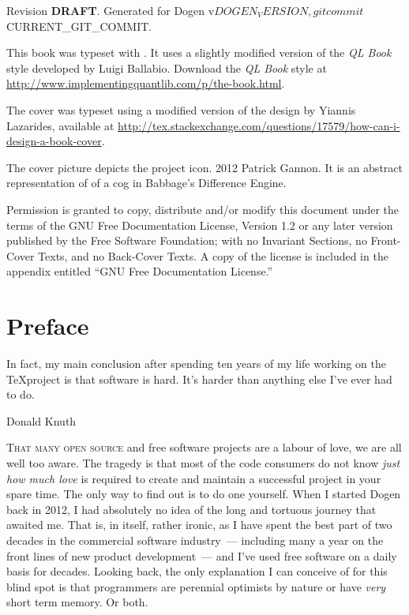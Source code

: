 \documentclass{book}
\begin{document}
Revision \textbf{DRAFT}. Generated for Dogen v${DOGEN_VERSION}, git
commit ${CURRENT_GIT_COMMIT}.

This book was typeset with \LaTeXe. It uses a slightly modified
version of the \textit{QL Book} style developed by Luigi Ballabio.
Download the \textit{QL Book} style at
\url{http://www.implementingquantlib.com/p/the-book.html}.

The cover was typeset using a modified version of the design by
Yiannis Lazarides, available at
\url{http://tex.stackexchange.com/questions/17579/how-can-i-design-a-book-cover}.

The cover picture depicts the project icon. \textcopyright{} 2012
Patrick Gannon. It is an abstract representation of of a cog in
Babbage's Difference Engine.

\par Permission is granted to copy, distribute and/or modify this
document under the terms of the GNU Free Documentation License,
Version 1.2 or any later version published by the Free Software
Foundation; with no Invariant Sections, no Front-Cover Texts, and no
Back-Cover Texts. A copy of the license is included in the appendix
entitled ``GNU Free Documentation License.''

\endgroup
\clearpage

\newpage

\setcounter{tocdepth}{2}
\tableofcontents
\listoffigures
\listoftables

\chapter*{Preface}

\epigraph{In fact, my main conclusion after spending ten years of my
  life working on the \TeX project is that software is hard. It's
  harder than anything else I've ever had to do.}{Donald Knuth}

\lettrine{T}{hat many open source} and free software projects are a
labour of love, we are all well too aware. The tragedy is that most of
the code consumers do not know \emph{just how much love} is required
to create and maintain a successful project in your spare time. The
only way to find out is to do one yourself. When I started Dogen back
in 2012, I had absolutely no idea of the long and tortuous journey
that awaited me. That is, in itself, rather ironic, as I have spent
the best part of two decades in the commercial software industry~---
including many a year on the front lines of new product
development~--- and I've used free software on a daily basis for
decades. Looking back, the only explanation I can conceive of for this
blind spot is that programmers are perennial optimists by nature or
have \emph{very} short term memory. Or both.
\end{document}

